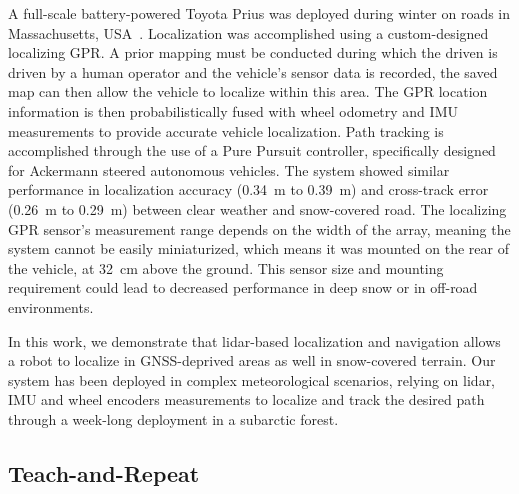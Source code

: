 A full-scale battery-powered Toyota Prius was deployed during winter on roads in Massachusetts, USA~\citep{Ort2020}.
Localization was accomplished using a custom-designed localizing \ac{GPR}. 
A prior mapping must be conducted during which the driven is driven by a human operator and the vehicle's sensor data is recorded, the saved map can then allow the vehicle to localize within this area.
The \ac{GPR} location information is then probabilistically fused with wheel odometry and \ac{IMU} measurements to provide accurate vehicle localization.
Path tracking is accomplished through the use of a Pure Pursuit controller, specifically designed for Ackermann steered autonomous vehicles.
The system showed similar performance in localization accuracy (\SI{0.34}{m} to \SI{0.39}{m}) and cross-track error (\SI{0.26}{m} to \SI{0.29}{m}) between clear weather and snow-covered road.
The localizing \ac{GPR} sensor's measurement range depends on the width of the array, meaning the system cannot be easily miniaturized, which means it was mounted on the rear of the vehicle, at \SI{32}{cm} above the ground.
This sensor size and mounting requirement could lead to decreased performance in deep snow or in off-road environments. 

In this work, we demonstrate that lidar-based localization and navigation allows a robot to localize in \ac{GNSS}-deprived areas as well in snow-covered terrain.
Our system has been deployed in complex meteorological scenarios, relying on lidar, \ac{IMU} and wheel encoders measurements to localize and track the desired path through a week-long deployment in a subarctic forest. 


\subsection{Teach-and-Repeat}
\label{rel_nav}


